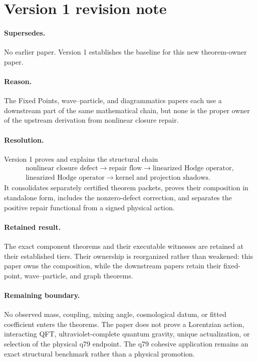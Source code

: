 \documentclass[11pt,a4paper]{article}
\begin{document}
\section*{Version 1 revision note}

\paragraph{Supersedes.}
No earlier paper.  Version 1 establishes the baseline for this new
theorem-owner paper.

\paragraph{Reason.}
The Fixed Points, wave--particle, and diagrammatics papers each use a
downstream part of the same mathematical chain, but none is the proper owner
of the upstream derivation from nonlinear closure repair.

\paragraph{Resolution.}
Version 1 proves and explains the structural chain
\[
\begin{gathered}
\text{nonlinear closure defect}
\longrightarrow
\text{repair flow}
\longrightarrow
\text{linearized Hodge operator},\\
\text{linearized Hodge operator}
\longrightarrow
\text{kernel and projection shadows}.
\end{gathered}
\]
It consolidates separately certified theorem packets, proves their
composition in standalone form, includes the nonzero-defect correction, and
separates the positive repair functional from a signed physical action.

\paragraph{Retained result.}
The exact component theorems and their executable witnesses are retained at
their established tiers.  Their ownership is reorganized rather than
weakened: this paper owns the composition, while the downstream papers retain
their fixed-point, wave--particle, and graph theorems.

\paragraph{Remaining boundary.}
No observed mass, coupling, mixing angle, cosmological datum, or fitted
coefficient enters the theorems.  The paper does not prove a Lorentzian
action, interacting QFT, ultraviolet-complete quantum gravity, unique
actualization, or selection of the physical q79 endpoint.  The q79 cohesive
application remains an exact structural benchmark rather than a physical
promotion.
\end{document}
